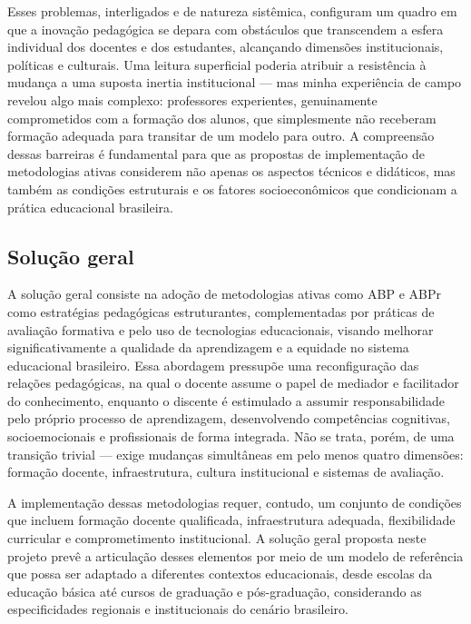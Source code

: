 Esses problemas, interligados e de natureza sistêmica, configuram um quadro em que a inovação pedagógica se depara com obstáculos que transcendem a esfera individual dos docentes e dos estudantes, alcançando dimensões institucionais, políticas e culturais. Uma leitura superficial poderia atribuir a resistência à mudança a uma suposta inertia institucional — mas minha experiência de campo revelou algo mais complexo: professores experientes, genuinamente comprometidos com a formação dos alunos, que simplesmente não receberam formação adequada para transitar de um modelo para outro. A compreensão dessas barreiras é fundamental para que as propostas de implementação de metodologias ativas considerem não apenas os aspectos técnicos e didáticos, mas também as condições estruturais e os fatores socioeconômicos que condicionam a prática educacional brasileira.

\subsection{Solução geral}
\label{subsec:solucao_geral}

A solução geral consiste na adoção de metodologias ativas como ABP e ABPr como estratégias pedagógicas estruturantes, complementadas por práticas de avaliação formativa e pelo uso de tecnologias educacionais, visando melhorar significativamente a qualidade da aprendizagem e a equidade no sistema educacional brasileiro. Essa abordagem pressupõe uma reconfiguração das relações pedagógicas, na qual o docente assume o papel de mediador e facilitador do conhecimento, enquanto o discente é estimulado a assumir responsabilidade pelo próprio processo de aprendizagem, desenvolvendo competências cognitivas, socioemocionais e profissionais de forma integrada. Não se trata, porém, de uma transição trivial — exige mudanças simultâneas em pelo menos quatro dimensões: formação docente, infraestrutura, cultura institucional e sistemas de avaliação.

A implementação dessas metodologias requer, contudo, um conjunto de condições que incluem formação docente qualificada, infraestrutura adequada, flexibilidade curricular e comprometimento institucional. A solução geral proposta neste projeto prevê a articulação desses elementos por meio de um modelo de referência que possa ser adaptado a diferentes contextos educacionais, desde escolas da educação básica até cursos de graduação e pós-graduação, considerando as especificidades regionais e institucionais do cenário brasileiro.

